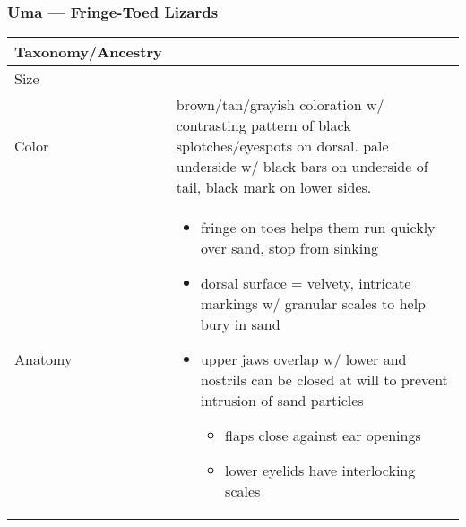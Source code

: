 \subsubsection{Uma --- Fringe-Toed Lizards}
\begin{center}
\begin{longtabu} to 

	\hline
	Taxonomy/Ancestry &
	
	 \\
	\hline
	Size & 
	
	\\
	\hline
	Color &
	brown/tan/grayish coloration w/ contrasting pattern of black splotches/eyespots on dorsal. pale underside w/ black bars on underside of tail, black mark on lower sides.
	 \\
	\hline
	Anatomy &
	\begin{itemize}[noitemsep]
		\item fringe on toes helps them run quickly over sand, stop from sinking
		\item dorsal surface = velvety, intricate markings w/ granular scales to help bury in sand
		\item upper jaws overlap w/ lower and nostrils can be closed at will to prevent intrusion of sand particles
			\begin{itemize}[noitemsep]
				\item flaps close against ear openings
				\item lower eyelids have interlocking scales 
			\end{itemize}
	\end{itemize}


\end{longtabu}
\end{center}
